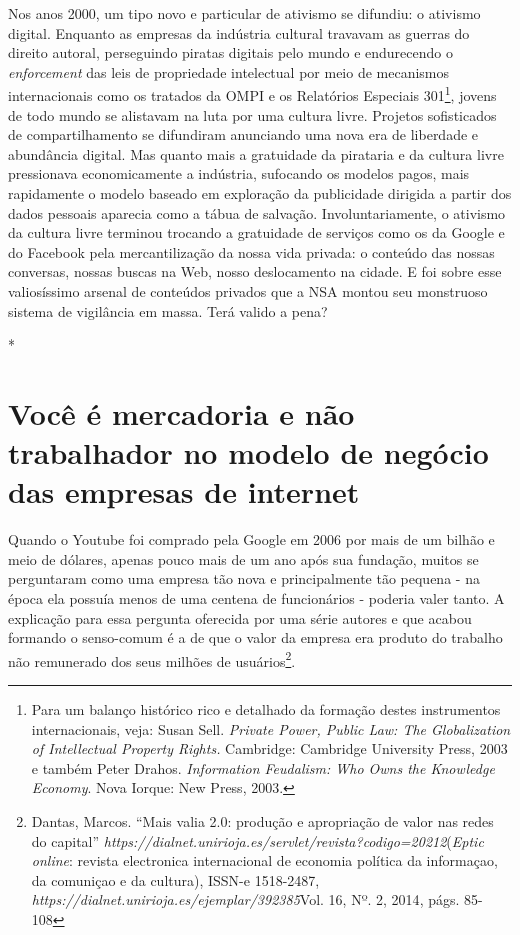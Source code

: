 Nos anos 2000, um tipo novo e particular de ativismo se difundiu: o
ativismo digital. Enquanto as empresas da indústria cultural travavam as
guerras do direito autoral, perseguindo piratas digitais pelo mundo e
endurecendo o \emph{enforcement} das leis de propriedade intelectual por
meio de mecanismos internacionais como os tratados da OMPI e os
Relatórios Especiais 301\footnote{Para um balanço
  histórico rico e detalhado da formação destes instrumentos
  internacionais, veja: Susan Sell. \emph{Private Power, Public Law: The
  Globalization of Intellectual Property Rights.} Cambridge: Cambridge
  University Press, 2003 e também Peter Drahos. \emph{Information
  Feudalism: Who Owns the Knowledge Economy}. Nova Iorque: New Press,
  2003.}, jovens de todo mundo se alistavam na luta por uma cultura
livre. Projetos sofisticados de compartilhamento se difundiram
anunciando uma nova era de liberdade e abundância digital. Mas quanto
mais a gratuidade da pirataria e da cultura livre pressionava
economicamente a indústria, sufocando os modelos pagos, mais rapidamente
o modelo baseado em exploração da publicidade dirigida a partir dos
dados pessoais aparecia como a tábua de salvação. Involuntariamente, o
ativismo da cultura livre terminou trocando a gratuidade de serviços
como os da Google e do Facebook pela mercantilização da nossa vida
privada: o conteúdo das nossas conversas, nossas buscas na Web, nosso
deslocamento na cidade. E foi sobre esse valiosíssimo arsenal de
conteúdos privados que a NSA montou seu monstruoso sistema de vigilância
em massa. Terá valido a pena?

*

\section{Você é mercadoria e não trabalhador no modelo de negócio das
empresas de internet}

Quando o Youtube foi comprado pela Google em 2006 por mais de um bilhão
e meio de dólares, apenas pouco mais de um ano após sua fundação, muitos
se perguntaram como uma empresa tão nova e principalmente tão pequena -
na época ela possuía menos de uma centena de funcionários - poderia
valer tanto. A explicação para essa pergunta oferecida por uma série
autores e que acabou formando o senso-comum é a de que o valor da
empresa era produto do trabalho não remunerado dos seus milhões de
usuários\footnote{Dantas, Marcos. ``Mais valia 2.0:
  produção e apropriação de valor nas redes do capital''
  \emph{https://dialnet.unirioja.es/servlet/revista?codigo=20212}(\emph{Eptic
    online}: revista electronica internacional de economia política da
  informaçao, da comuniçao e da cultura), ISSN-e 1518-2487,
  \emph{https://dialnet.unirioja.es/ejemplar/392385}{{Vol. 16, Nº. 2,
  2014}}, págs. 85-108}.

